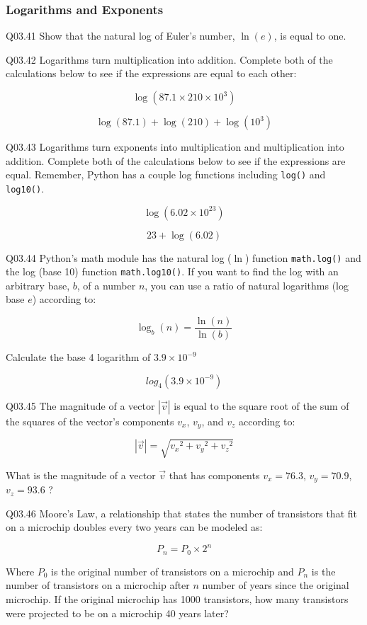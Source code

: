 \documentclass{book}
\newenvironment{problems}{}{}  %
\newcommand{\passthrough}[1]{#1}
\begin{document}
    
        \begin{problems}
        \hypertarget{logarithms-and-exponents}{%
\subsubsection{Logarithms and
Exponents}\label{logarithms-and-exponents}}

Q03.41 Show that the natural log of Euler's number, \(\ln(e)\), is equal
to one.

Q03.42 Logarithms turn multiplication into addition. Complete both of
the calculations below to see if the expressions are equal to each
other:

\[ \log(87.1 \times 210 \times 10^{3}) \]

\[ \log(87.1) + \log(210) + \log(10^{3}) \]

Q03.43 Logarithms turn exponents into multiplication and multiplication
into addition. Complete both of the calculations below to see if the
expressions are equal. Remember, Python has a couple log functions
including \passthrough{\lstinline!log()!} and
\passthrough{\lstinline!log10()!}.

\[ \log(6.02 \times 10^{23}) \]

\[ 23+\log(6.02) \]

Q03.44 Python's math module has the natural log (\(\ln\)) function
\passthrough{\lstinline!math.log()!} and the log (base 10) function
\passthrough{\lstinline!math.log10()!}. If you want to find the log with
an arbitrary base, \(b\), of a number \(n\), you can use a ratio of
natural logarithms (log base \(e\)) according to:

\[ \log_b(n) = \frac{\ln(n)}{\ln(b)} \]

Calculate the base 4 logarithm of \(3.9 \times 10^{-9}\)

\[ log_{4}(3.9 \times 10^{-9}) \]

Q03.45 The magnitude of a vector \(|\vec{v}|\) is equal to the square
root of the sum of the squares of the vector's components \(v_x\),
\(v_y\), and \(v_z\) according to:

\[ |\vec{v}| = \sqrt{{v_x}^2 + {v_y}^2 + {v_z}^2} \]

What is the magnitude of a vector \(\vec{v}\) that has components
\(v_x = 76.3\), \(v_y = 70.9\), \(v_z = 93.6\) ?

Q03.46 Moore's Law, a relationship that states the number of transistors
that fit on a microchip doubles every two years can be modeled as:

\[ P_n = P_0 \times 2^n \]

Where \(P_0\) is the original number of transistors on a microchip and
\(P_n\) is the number of transistors on a microchip after \(n\) number
of years since the original microchip. If the original microchip has
1000 transistors, how many transistors were projected to be on a
microchip 40 years later?
        \end{problems}
\end{document}
